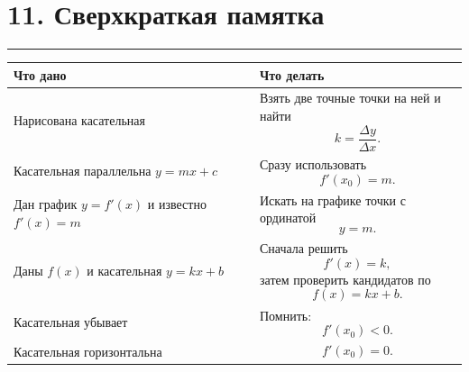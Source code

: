 \documentclass[a4paper,12pt]{article}
\newcommand{\topicrule}{%
  \par\noindent
  {\color{accent}\rule{\linewidth}{0.55pt}}
  \par
}
\begin{document}

\section*{\color{darkaccent}11. Сверхкраткая памятка}
\topicrule

\begin{center}

\renewcommand{\arraystretch}{1.5}

\begin{tabularx}{0.95\linewidth}
{@{}p{54mm}X@{}}

\toprule

\textbf{Что дано}
&
\textbf{Что делать}
\\

\midrule

Нарисована касательная
&
Взять две точные точки на ней и найти
\[
k=
\frac{\Delta y}{\Delta x}.
\]
\\

Касательная параллельна
\(y=mx+c\)
&
Сразу использовать
\[
f'(x_0)=m.
\]
\\

Дан график
\(y=f'(x)\)
и известно
\(f'(x)=m\)
&
Искать на графике точки с ординатой
\[
y=m.
\]
\\

Даны
\(f(x)\)
и касательная
\(y=kx+b\)
&
Сначала решить
\[
f'(x)=k,
\]
затем проверить кандидатов по
\[
f(x)=kx+b.
\]
\\

Касательная убывает
&
Помнить:
\[
f'(x_0)<0.
\]
\\

Касательная горизонтальна
&
\[
f'(x_0)=0.
\]
\\

\bottomrule

\end{tabularx}

\end{center}
\end{document}
